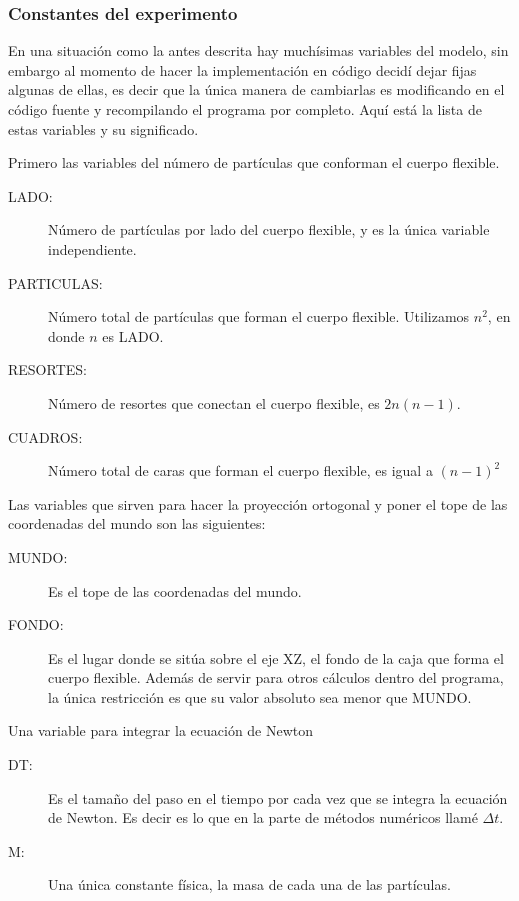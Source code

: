 \subsubsection{Constantes del experimento}
En una situación como la antes descrita hay muchísimas variables del modelo, sin embargo al momento de hacer la implementación en código decidí dejar fijas algunas de ellas, es decir que la única manera de cambiarlas es modificando en el código fuente y recompilando el programa por completo.
Aquí está la lista de estas variables y su significado.

Primero las  variables del número de partículas que conforman el cuerpo flexible.

\begin{description}
 \item[LADO:] Número de partículas por lado del cuerpo flexible, y es la única variable independiente.
 \item[PARTICULAS:] Número total de partículas que forman el cuerpo flexible. Utilizamos $n^{2}$, en donde $n$ es LADO.
 \item[RESORTES:]Número de resortes que conectan el cuerpo flexible, es $2n(n - 1)$.
 \item[CUADROS:]Número total de caras que forman el cuerpo flexible, es igual a $(n - 1)^{2}$
\end{description}

Las variables que sirven para hacer la proyección ortogonal y poner el tope de las coordenadas del mundo son las siguientes:
\begin{description}
 \item[MUNDO:] Es el tope de las coordenadas del mundo.
 \item[FONDO:] Es el lugar donde se sitúa sobre el eje XZ, el fondo de la caja que forma el cuerpo flexible. Además de servir para otros cálculos dentro del programa, la única restricción es que su valor absoluto sea menor que MUNDO.
\end{description}

Una variable para integrar la ecuación de Newton 
\begin{description}
 \item[DT:] Es el tamaño del paso en el tiempo por cada vez que se integra la ecuación de Newton. Es decir es lo que en la parte de métodos numéricos llamé $\Delta t$.
\end{description}

\begin{description}
 \item[M:] Una única constante física, la masa de cada una de las partículas.
\end{description}
 
